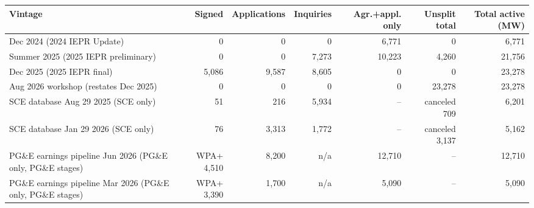 \begin{tabular}{p{5.6cm}rrrrrr}
\toprule
Vintage & Signed & Applications & Inquiries & Agr.+appl. only & Unsplit total & Total active (MW) \\
\midrule
Dec 2024 (2024 IEPR Update) & 0 & 0 & 0 & 6,771 & 0 & 6,771 \\
Summer 2025 (2025 IEPR preliminary) & 0 & 0 & 7,273 & 10,223 & 4,260 & 21,756 \\
Dec 2025 (2025 IEPR final) & 5,086 & 9,587 & 8,605 & 0 & 0 & 23,278 \\
Aug 2026 workshop (restates Dec 2025) & 0 & 0 & 0 & 0 & 23,278 & 23,278 \\
SCE database Aug 29 2025 (SCE only) & 51 & 216 & 5,934 & -- & canceled 709 & 6,201 \\
SCE database Jan 29 2026 (SCE only) & 76 & 3,313 & 1,772 & -- & canceled 3,137 & 5,162 \\
PG\&E earnings pipeline Jun 2026 (PG\&E only, PG\&E stages) & WPA+ 4,510 & 8,200 & n/a & 12,710 & -- & 12,710 \\
PG\&E earnings pipeline Mar 2026 (PG\&E only, PG\&E stages) & WPA+ 3,390 & 1,700 & n/a & 5,090 & -- & 5,090 \\
\bottomrule
\end{tabular}